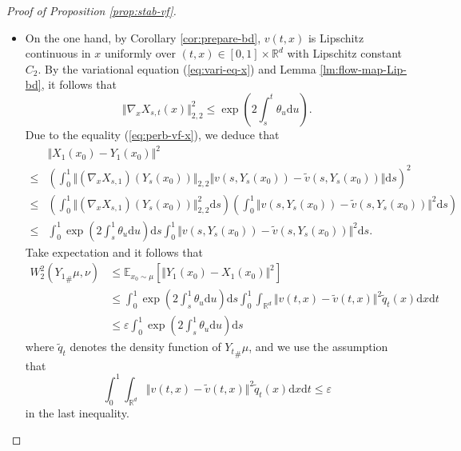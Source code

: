 \documentclass[twoside,11pt]{article}
\def\sR{{\mathbb{R}}}
\newcommand{\E}{\mathbb{E}}
\def\paref#1{(\ref{#1})}
\newcommand{\diff}{\mathrm{d}}
\numberwithin{equation}{section}
\begin{document}
\begin{proof} [Proof of Proposition \ref{prop:stab-vf}]
\begin{itemize}
\item[(i)] On the one hand, by Corollary \ref{cor:prepare-bd}, $v(t, x)$ is Lipschitz continuous in $x$ uniformly over $(t, x) \in [0, 1] \times \sR^d$ with Lipschitz constant $C_2$. By the variational equation \paref{eq:vari-eq-x} and Lemma \ref{lm:flow-map-Lip-bd}, it follows that
\begin{equation*}
    \Vert \nabla_x X_{s,t}(x) \Vert_{2,2}^2 \le \exp \left( 2 \int_s^t \theta_u \diff u \right).
\end{equation*}
Due to the equality \paref{eq:perb-vf-x}, we deduce that
\begin{align*}
        & \Vert X_1(x_0) - Y_1(x_0) \Vert^2 \\
    \le & \left( \int_0^1 \Vert (\nabla_x X_{s,1}) (Y_s(x_0)) \Vert_{2,2} \Vert v(s, Y_s(x_0)) - \tilde{v}(s, Y_s(x_0)) \Vert \diff s \right)^2 \\
    \le & \left( \int_0^1 \Vert (\nabla_x X_{s,1}) (Y_s(x_0)) \Vert_{2,2}^2 \diff s \right)
    \left( \int_0^1 \Vert v(s, Y_s(x_0)) - \tilde{v}(s, Y_s(x_0)) \Vert^2 \diff s \right) \\
    \le & \int_0^1 \exp \left( 2 \int_s^1 \theta_u \diff u \right) \diff s \int_0^1 \Vert v(s, Y_s(x_0)) - \tilde{v}(s, Y_s(x_0)) \Vert^2 \diff s.
\end{align*}
Take expectation and it follows that
\begin{align*}
    W_2^2({Y_1}_{\#} \mu, \nu)
    &\le \E_{x_0 \sim \mu} \left[ \Vert Y_1(x_0) - X_1(x_0) \Vert^2 \right] \\
    &\le \int_0^1 \exp \left( 2 \int_s^1 \theta_u \diff u \right) \diff s \int_0^1 \int_{\sR^d} \Vert v(t, x) - \tilde{v}(t, x) \Vert^2 \tilde{q}_t(x) \diff x \diff t \\
    &\le \varepsilon \int_0^1 \exp \left( 2 \int_s^1 \theta_u \diff u \right) \diff s
\end{align*}
where $\tilde{q}_t$ denotes the density function of ${Y_t}_{\#} \mu$, and we use the assumption that
\begin{equation*}
    \int_0^1 \int_{\sR^d} \Vert v(t, x) - \tilde{v}(t, x) \Vert^2 \tilde{q}_t(x) \diff x \diff t \le \varepsilon
\end{equation*}
in the last inequality.


\end{itemize}
\end{proof}
\end{document}
